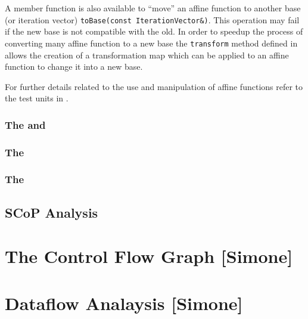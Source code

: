A member function is also available to ``move'' an affine function to another base
(or iteration vector) {\tt toBase(const IterationVector\&)}. This operation may
fail if the new base is not compatible with the old. In order to speedup the
process of converting many affine function to a new base the {\tt transform}
method defined in  allows the creation of
a transformation map which can be applied to an affine function to change it
into a new base. 

For further details related to the use and manipulation of affine functions
refer to the test units in . 

\subsubsection{The  and } 
\subsubsection{The }
\subsubsection{The }

\subsection{SCoP Analysis}



\section{The Control Flow Graph [Simone]}
\label{insieme:analysis:cfg}



\section{Dataflow Analaysis [Simone]}
\label{insieme:analysis:dtaflow}
